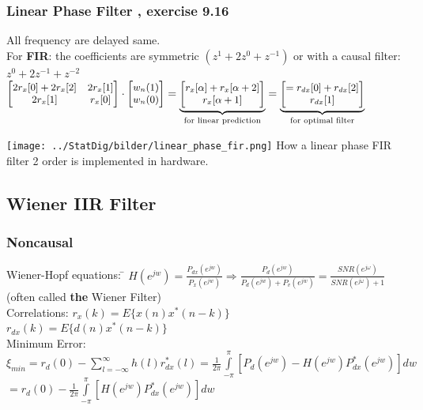 \begin{minipage}{11.5cm}
\subsubsection{Linear Phase Filter , exercise 9.16} 
All frequency are delayed same. \\
For \textbf{FIR}: the coefficients are symmetric $(z^1+2z^0+z^{-1})$ or with a causal filter: $z^0 + 2z^{-1} + z^{-2}$\\
$\small \begin{bmatrix}
2 r_x[0] + 2 r_x[2]		&	2 r_x[1] \\
2 r_x[1]				& 	r_x[0]
\end{bmatrix} \cdot \begin{bmatrix}
w_n(1)\\
w_n(0)
\end{bmatrix}= \underbrace{ \begin{bmatrix}
r_x[\alpha] + r_x[\alpha+2]\\
r_x[\alpha+1]
\end{bmatrix}}_{\text{for linear prediction} } 
= \underbrace{ \begin{bmatrix} = 
r_{dx}[0] + r_{dx}[2]\\
r_{dx}[1]
\end{bmatrix}    }_{\text{for optimal filter} }  $

\end{minipage}
\hspace{3mm}
\begin{minipage}{7cm}
\texttt{[image: ../StatDig/bilder/linear\_phase\_fir.png]}
How a linear phase FIR filter 2 order is implemented in hardware.
\end{minipage}
\subsection{Wiener IIR Filter}
\begin{minipage}{8cm}
\subsubsection{Noncausal }
\begin{tabbing}
Wiener-Hopf equations: \=
$H(e^{jw})=\frac{P_{dx}(e^{jw})}{P_{x}(e^{jw})}  \Rightarrow
\frac{P_{d}(e^{jw})}{P_{d}(e^{jw}) + P_{v}(e^{jw})}= \frac{SNR(e^{j\omega})}{SNR(e^{j\omega}) + 1}$ (often called \textbf{the} Wiener Filter) \\

Correlations: \>
	$r_x(k) =E \{ x(n)x^{*}(n-k) \} $\\ 
	\>$r_{dx}(k) =E\{d(n)x^{*}(n-k)\}$\\


Minimum Error:\>
	$\xi_{min} =r_d(0)-\sum \limits_{l=-\infty}^\infty h(l)r_{dx}^{*}(l)
	=\frac{1}{2\pi}\int \limits_{-\pi}^\pi[P_d(e^{jw})-H(e^{jw})P_{dx}^{*}(e^{jw})]dw$\\
	\>$=r_d(0)-\frac{1}{2\pi}\int \limits_{-\pi}^\pi[H(e^{jw})P_{dx}^{*}(e^{jw})]dw$
\end{tabbing}

\end{minipage}

